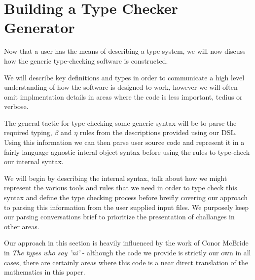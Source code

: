 \chapter{Building a Type Checker Generator}

Now that a user has the means of describing a type system, we will now
discuss how the generic type-checking software is constructed.

We will describe key definitions and types in order to communicate a
high level understanding of how the software is designed to work,
however we will often omit implmentation details in areas where the
code is less important, tedius or verbose.

The general tactic for type-checking some generic syntax will be to
parse the required typing, $\beta$ and $\eta$ rules from the
descriptions provided using our DSL. Using this information we can
then parse user source code and represent it in a fairly language
agnostic interal object syntax before using the rules to type-check
our internal syntax.

We will begin by describing the internal syntax, talk about how we
might represent the various tools and rules that we need in order to
type check this syntax and define the type checking process before
breifly covering our approach to parsing this information from the
user supplied input files. We purposely keep our parsing conversations
brief to prioritize the presentation of challanges in other areas.

Our approach in this section is heavily influenced by the work of
Conor McBride in \emph{The types who say 'ni'} \cite{TypesWhoSayNi} -
although the code we provide is strictly our own in all cases, there
are certainly areas where this code is a near direct translation of
the mathematics in this paper.

\\\\

















